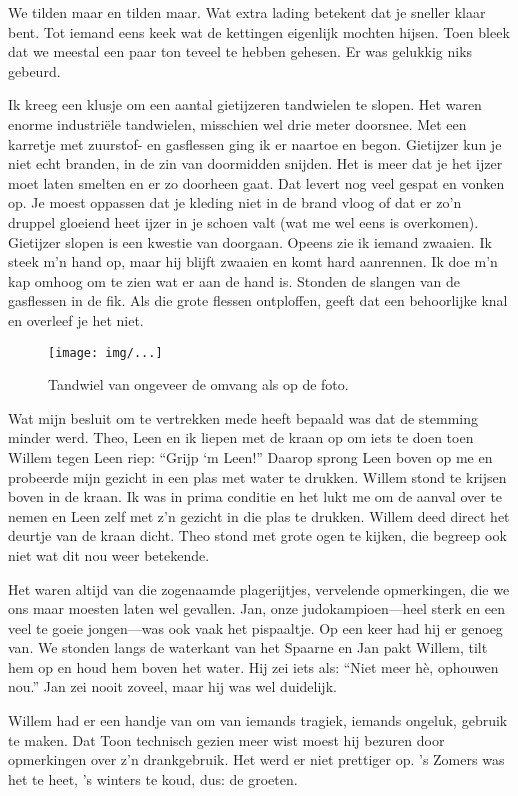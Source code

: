 \documentclass[10pt,twoside,openright]{memoir}
\begin{document}
We tilden maar en tilden maar. Wat extra lading betekent dat je sneller klaar bent. Tot iemand eens keek wat de kettingen eigenlijk mochten hijsen. Toen bleek dat we meestal een paar ton teveel te hebben gehesen. Er was gelukkig niks gebeurd.

Ik kreeg een klusje om een aantal gietijzeren tandwielen te slopen. Het waren enorme industriële tandwielen, misschien wel drie meter doorsnee. Met een karretje met zuurstof- en gasflessen ging ik er naartoe en begon. Gietijzer kun je niet echt branden, in de zin van doormidden snijden. Het is meer dat je het ijzer moet laten smelten en er zo doorheen gaat. Dat levert nog veel gespat en vonken op. Je moest oppassen dat je kleding niet in de brand vloog of dat er zo’n druppel gloeiend heet ijzer in je schoen valt (wat me wel eens is overkomen). Gietijzer slopen is een kwestie van doorgaan. Opeens zie ik iemand zwaaien. Ik steek m’n hand op, maar hij blijft zwaaien en komt hard aanrennen. Ik doe m’n kap omhoog om te zien wat er aan de hand is. Stonden de slangen van de gasflessen in de fik. Als die grote flessen ontploffen, geeft dat een behoorlijke knal en overleef je het niet. 

\begin{figure}[t]
\texttt{[image: img/...]}
\caption{Tandwiel van ongeveer de omvang als op de foto.}
\end{figure}

Wat mijn besluit om te vertrekken mede heeft bepaald was dat de stemming minder werd. Theo, Leen en ik liepen met de kraan op om iets te doen toen Willem tegen Leen riep: ``Grijp ‘m Leen!'' Daarop sprong Leen boven op me en probeerde mijn gezicht in een plas met water te drukken. Willem stond te krijsen boven in de kraan. Ik was in prima conditie en het lukt me om de aanval  over te nemen en Leen zelf met z’n gezicht in die plas te drukken. Willem deed direct het deurtje van de kraan dicht. Theo stond met grote ogen te kijken, die begreep ook niet wat dit nou weer betekende.

Het waren altijd van die zogenaamde plagerijtjes, vervelende opmerkingen, die we ons maar moesten laten wel gevallen. Jan, onze judokampioen---heel sterk en een veel te goeie jongen---was ook vaak het pispaaltje. Op een keer had hij er genoeg van. We stonden langs de waterkant van het Spaarne en Jan pakt Willem, tilt hem op en houd hem boven het water. Hij zei iets als: ``Niet meer hè, ophouwen nou.'' Jan zei nooit zoveel, maar hij was wel duidelijk.

Willem had er een handje van om van iemands tragiek, iemands ongeluk, gebruik te maken. Dat Toon technisch gezien meer wist moest hij bezuren door opmerkingen over z’n drankgebruik. Het werd er niet prettiger op. ’s Zomers was het te heet, ’s winters te koud, dus: de groeten.
\end{document}
